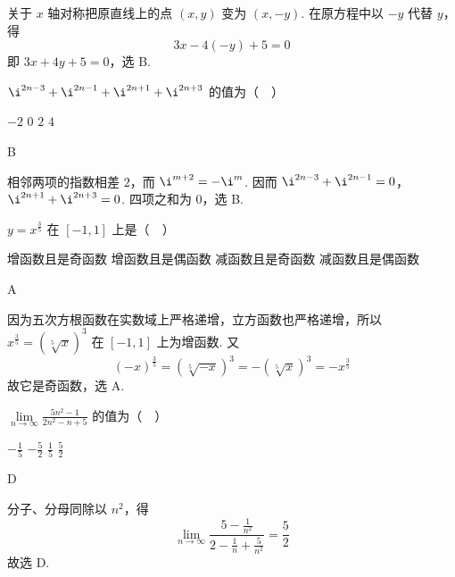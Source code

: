 \begin{solution}
关于 \(x\) 轴对称把原直线上的点 \((x,y)\) 变为 \((x,-y)\). 在原方程中以 \(-y\) 代替 \(y\)，得
\[
3x-4(-y)+5=0
\]
即 \(3x+4y+5=0\)，选 B.
\end{solution}

\begin{problem}
\(\i^{2n-3}+\i^{2n-1}+\i^{2n+1}+\i^{2n+3}\) 的值为（\(\quad\)）

\choices
    {\(-2\)}
    {\(0\)}
    {\(2\)}
    {\(4\)}
\end{problem}

\begin{answer}
B
\end{answer}

\begin{solution}
相邻两项的指数相差 \(2\)，而 \(\i^{m+2}=-\i^m\). 因而
\(\i^{2n-3}+\i^{2n-1}=0\)，\(\i^{2n+1}+\i^{2n+3}=0\).
四项之和为 \(0\)，选 B.
\end{solution}

\begin{problem}
\(y=x^{\frac{3}{5}}\) 在 \([-1,1]\) 上是（\(\quad\)）

\choices
    {增函数且是奇函数}
    {增函数且是偶函数}
    {减函数且是奇函数}
    {减函数且是偶函数}
\end{problem}

\begin{answer}
A
\end{answer}

\begin{solution}
因为五次方根函数在实数域上严格递增，立方函数也严格递增，所以 \(x^{\frac{3}{5}}=\left(\sqrt[5]{x}\right)^3\) 在 \([-1,1]\) 上为增函数. 又
\[
(-x)^{\frac{3}{5}}=\left(\sqrt[5]{-x}\right)^3=-\left(\sqrt[5]{x}\right)^3=-x^{\frac{3}{5}}
\]
故它是奇函数，选 A.
\end{solution}

\begin{problem}
\(\displaystyle\lim\limits_{n\to\infty}\frac{5n^2-1}{2n^2-n+5}\) 的值为（\(\quad\)）

\choices
    {\(-\frac{1}{5}\)}
    {\(-\frac{5}{2}\)}
    {\(\frac{1}{5}\)}
    {\(\frac{5}{2}\)}
\end{problem}

\begin{answer}
D
\end{answer}

\begin{solution}
分子、分母同除以 \(n^2\)，得
\[
\lim_{n\to\infty}\frac{5-\frac{1}{n^2}}{2-\frac{1}{n}+\frac{5}{n^2}}=\frac{5}{2}
\]
故选 D.
\end{solution}

